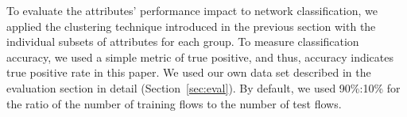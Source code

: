 \documentclass[conference]{IEEEtran}
\begin{document}

To evaluate the attributes' performance impact to network classification, we applied the clustering technique introduced in the previous section with the individual subsets of attributes for each group. 
To measure classification accuracy, we used a simple metric of true positive, and thus, accuracy indicates true positive rate in this paper.
We used our own data set described in the evaluation section in detail (Section~\ref{sec:eval}).
By default, we used 90\%:10\% for the ratio of the number of training flows to the number of test flows.
\end{document}
